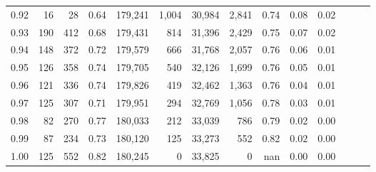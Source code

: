 \begin{tabular}{rrrrrrrrrrrrrr}
0.92 &     16 &   28 &  0.64 &  179,241 &    1,004 &  30,984 &   2,841 &  0.74 &  0.08 &      0.02 \\
0.93 &    190 &  412 &  0.68 &  179,431 &      814 &  31,396 &   2,429 &  0.75 &  0.07 &      0.02 \\
0.94 &    148 &  372 &  0.72 &  179,579 &      666 &  31,768 &   2,057 &  0.76 &  0.06 &      0.01 \\
0.95 &    126 &  358 &  0.74 &  179,705 &      540 &  32,126 &   1,699 &  0.76 &  0.05 &      0.01 \\
0.96 &    121 &  336 &  0.74 &  179,826 &      419 &  32,462 &   1,363 &  0.76 &  0.04 &      0.01 \\
0.97 &    125 &  307 &  0.71 &  179,951 &      294 &  32,769 &   1,056 &  0.78 &  0.03 &      0.01 \\
0.98 &     82 &  270 &  0.77 &  180,033 &      212 &  33,039 &     786 &  0.79 &  0.02 &      0.00 \\
0.99 &     87 &  234 &  0.73 &  180,120 &      125 &  33,273 &     552 &  0.82 &  0.02 &      0.00 \\
1.00 &    125 &  552 &  0.82 &  180,245 &        0 &  33,825 &       0 &   nan &  0.00 &      0.00 \\
\bottomrule
\end{tabular}
